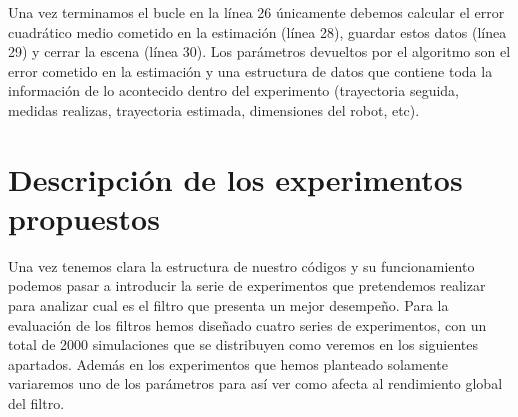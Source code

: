 Una vez terminamos el bucle en la línea 26 únicamente debemos calcular el error cuadrático medio cometido en la estimación (línea 28), guardar estos datos (línea 29) y cerrar la escena (línea 30).
Los parámetros devueltos por el algoritmo son el error cometido en la estimación y una estructura de datos que contiene toda la información de lo acontecido dentro del experimento (trayectoria seguida, medidas realizas,  trayectoria estimada, dimensiones del robot, etc).
%
%
%

\section{Descripción de los experimentos propuestos}%
%
%
%

Una vez tenemos clara la estructura de nuestro códigos y su funcionamiento podemos pasar a introducir la serie de experimentos que pretendemos realizar para analizar cual es el filtro que presenta un mejor desempeño.
Para la evaluación de los filtros hemos diseñado cuatro series de experimentos, con un total de 2000 simulaciones que se distribuyen como veremos en los siguientes apartados.
Además en los experimentos que hemos planteado solamente variaremos uno de los parámetros para así ver como afecta al rendimiento global del filtro.
%
%
%
%
%
%

